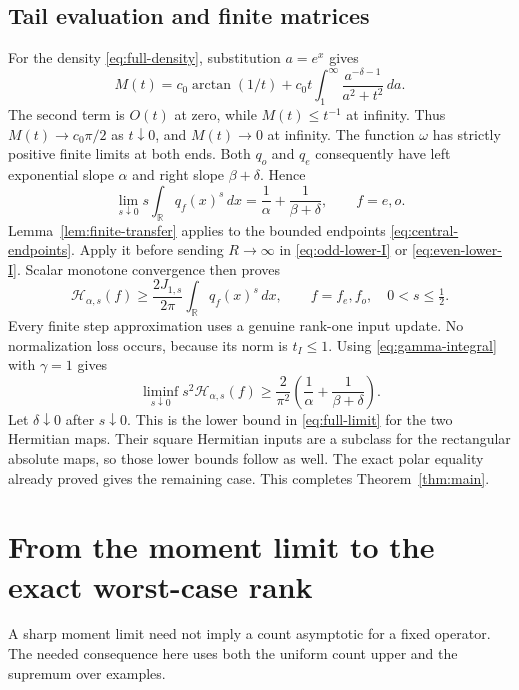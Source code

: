 \documentclass[11pt]{article}
\numberwithin{equation}{section}
\newcommand{\R}{\mathbb R}
\newcommand{\cH}{\mathcal H}
\begin{document}
\subsection*{Tail evaluation and finite matrices}
For the density \eqref{eq:full-density}, substitution $a=e^x$ gives
\[
 M(t)=c_0\arctan(1/t)
       +c_0t\int_1^\infty\frac{a^{-\delta-1}}{a^2+t^2}\,da.
\]
The second term is $O(t)$ at zero, while $M(t)\le t^{-1}$ at infinity.
Thus $M(t)\to c_0\pi/2$ as $t\downarrow0$, and $M(t)\to0$ at infinity.
The function $\omega$ has strictly positive finite limits at both ends.
Both $q_o$ and $q_e$ consequently have left exponential slope $\alpha$
and right slope $\beta+\delta$. Hence
\[
 \lim_{s\downarrow0}s\int_\R q_f(x)^s\,dx
       =\frac1\alpha+\frac1{\beta+\delta},\qquad f=e,o.
\]
Lemma~\ref{lem:finite-transfer} applies to the bounded endpoints
\eqref{eq:central-endpoints}. Apply it before sending $R\to\infty$ in
\eqref{eq:odd-lower-I} or \eqref{eq:even-lower-I}. Scalar monotone
convergence then proves
\[
 \cH_{\alpha,s}(f)
       \ge\frac{2J_{1,s}}{2\pi}\int_\R q_f(x)^s\,dx,
       \qquad f=f_e,f_o,\quad 0<s\le\tfrac12.
\]
Every finite step approximation uses a genuine rank-one input update.
No normalization loss occurs, because its norm is $t_I\le1$.
Using \eqref{eq:gamma-integral} with $\gamma=1$ gives
\[
 \liminf_{s\downarrow0}s^2\cH_{\alpha,s}(f)
       \ge\frac2{\pi^2}
                    \left(\frac1\alpha+\frac1{\beta+\delta}\right).
\]
Let $\delta\downarrow0$ after $s\downarrow0$. This is the lower bound
in \eqref{eq:full-limit} for the two Hermitian maps. Their square
Hermitian inputs are a subclass for the rectangular absolute maps,
so those lower bounds follow as well. The exact polar equality already
proved gives the remaining case. This completes Theorem~\ref{thm:main}.

\section{From the moment limit to the exact worst-case rank}

A sharp moment limit need not imply a count asymptotic for a fixed
operator. The needed consequence here uses both the uniform count
upper and the supremum over examples.
\end{document}
